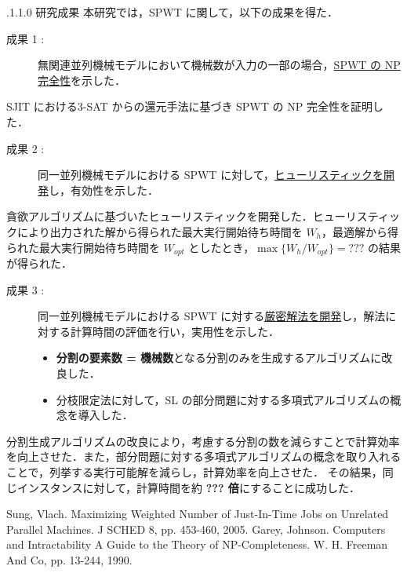 \documentclass[oneside, 10pt, twocolumn]{jarticle}
\makeatletter
\def\section{\@startsection {section}{1}{\z@}{-3.5ex plus -1ex minus
-.2ex}{2.3 ex plus .2ex}{\large\bf}}
\renewcommand{\section}{
\@startsection{section}{1}{\z@}
{.1\Cvs \@plus.0\Cdp \@minus.1\Cdp}%
{.1\Cvs \@plus.1\Cdp \@minus.0\Cdp}%
{\reset@font\large\bfseries}}      %
\makeatother
\begin{document}
\section{研究成果}
本研究では，SPWT に関して，以下の成果を得た．
\begin{description}
  \item[成果 1 : ]
  無関連並列機械モデルにおいて機械数が入力の一部の場合，\underline{SPWT の NP 完全性}を示した．
\end{description}
SJIT における\textsc{3-SAT} からの還元手法に基づき SPWT の NP 完全性を証明した．

\begin{description}
  \item[成果 2 : ]
  同一並列機械モデルにおける SPWT に対して，\underline{ヒューリスティックを開発}し，有効性を示した．
\end{description}
貪欲アルゴリズムに基づいたヒューリスティックを開発した．ヒューリスティックにより出力された解から得られた最大実行開始待ち時間を $W_h$，最適解から得られた最大実行開始待ち時間を $W_{opt}$ としたとき，\mbox{\boldmath $\max\big\{W_h/W_{opt}\big\} = ???$} の結果が得られた．

\begin{description}
  \item[成果 3 : ]
  同一並列機械モデルにおける SPWT に対する\underline{厳密解法を開発}し，解法に対する計算時間の評価を行い，実用性を示した．
  \begin{itemize}
    \setlength{\leftskip}{-10mm}
    \item {\bf 分割の要素数 = 機械数}となる分割のみを生成するアルゴリズムに改良した．
    \item 分枝限定法に対して，SL の部分問題に対する多項式アルゴリズムの概念を導入した．
  \end{itemize}
\end{description}
分割生成アルゴリズムの改良により，考慮する分割の数を減らすことで計算効率を向上させた．また，部分問題に対する多項式アルゴリズムの概念を取り入れることで，列挙する実行可能解を減らし，計算効率を向上させた．
その結果，同じインスタンスに対して，計算時間を約 {\bf ??? 倍}にすることに成功した．

\begin{thebibliography}{9} %
  Sung, Vlach.
  Maximizing Weighted Number of Just-In-Time Jobs on Unrelated Parallel Machines. J SCHED 8, pp. 453-460, 2005.
  \vspace{-2mm}
  Garey, Johnson.
  Computers and Intractability A Guide to the Theory of NP-Completeness.
  W. H. Freeman And Co, pp. 13-244, 1990.
\end{thebibliography}
\end{document}

